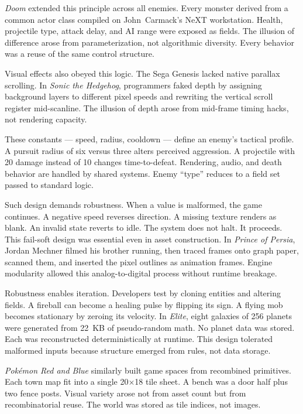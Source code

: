 \emph{Doom} extended this principle across all enemies. Every monster derived from a common actor class compiled on John Carmack’s NeXT workstation. Health, projectile type, attack delay, and AI range were exposed as fields. The illusion of difference arose from parameterization, not algorithmic diversity. Every behavior was a reuse of the same control structure.

Visual effects also obeyed this logic. The Sega Genesis lacked native parallax scrolling. In \emph{Sonic the Hedgehog}, programmers faked depth by assigning background layers to different pixel speeds and rewriting the vertical scroll register mid-scanline. The illusion of depth arose from mid-frame timing hacks, not rendering capacity.

These constants — speed, radius, cooldown — define an enemy’s tactical profile. A pursuit radius of six versus three alters perceived aggression. A projectile with 20 damage instead of 10 changes time-to-defeat. Rendering, audio, and death behavior are handled by shared systems. Enemy “type” reduces to a field set passed to standard logic.

Such design demands robustness. When a value is malformed, the game continues. A negative speed reverses direction. A missing texture renders as blank. An invalid state reverts to idle. The system does not halt. It proceeds. This fail-soft design was essential even in asset construction. In \emph{Prince of Persia}, Jordan Mechner filmed his brother running, then traced frames onto graph paper, scanned them, and inserted the pixel outlines as animation frames. Engine modularity allowed this analog-to-digital process without runtime breakage.

Robustness enables iteration. Developers test by cloning entities and altering fields. A fireball can become a healing pulse by flipping its sign. A flying mob becomes stationary by zeroing its velocity. In \emph{Elite}, eight galaxies of 256 planets were generated from 22 KB of pseudo-random math. No planet data was stored. Each was reconstructed deterministically at runtime. This design tolerated malformed inputs because structure emerged from rules, not data storage.

\emph{Pokémon Red and Blue} similarly built game spaces from recombined primitives. Each town map fit into a single 20×18 tile sheet. A bench was a door half plus two fence posts. Visual variety arose not from asset count but from recombinatorial reuse. The world was stored as tile indices, not images.

